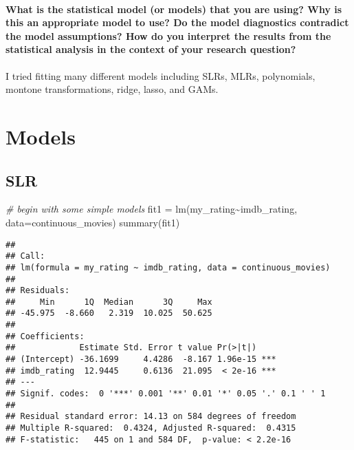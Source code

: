 \documentclass[
]{article}
\newenvironment{Shaded}{\begin{snugshade}}{\end{snugshade}}
\newcommand{\AttributeTok}[1]{\textcolor[rgb]{0.77,0.63,0.00}{#1}}
\newcommand{\CommentTok}[1]{\textcolor[rgb]{0.56,0.35,0.01}{\textit{#1}}}
\newcommand{\FunctionTok}[1]{\textcolor[rgb]{0.00,0.00,0.00}{#1}}
\newcommand{\NormalTok}[1]{#1}
\newcommand{\OtherTok}[1]{\textcolor[rgb]{0.56,0.35,0.01}{#1}}
\newcommand{\SpecialCharTok}[1]{\textcolor[rgb]{0.00,0.00,0.00}{#1}}
\begin{document}
\hypertarget{what-is-the-statistical-model-or-models-that-you-are-using-why-is-this-an-appropriate-model-to-use-do-the-model-diagnostics-contradict-the-model-assumptions-how-do-you-interpret-the-results-from-the-statistical-analysis-in-the-context-of-your-research-question}{%
\paragraph{What is the statistical model (or models) that you are using?
Why is this an appropriate model to use? Do the model diagnostics
contradict the model assumptions? How do you interpret the results from
the statistical analysis in the context of your research
question?}\label{what-is-the-statistical-model-or-models-that-you-are-using-why-is-this-an-appropriate-model-to-use-do-the-model-diagnostics-contradict-the-model-assumptions-how-do-you-interpret-the-results-from-the-statistical-analysis-in-the-context-of-your-research-question}}

I tried fitting many different models including SLRs, MLRs, polynomials,
montone transformations, ridge, lasso, and GAMs.

\hypertarget{models}{%
\section{Models}\label{models}}

\hypertarget{slr}{%
\subsection{SLR}\label{slr}}

\begin{Shaded}
\begin{Highlighting}[]
\CommentTok{\# begin with some simple models}
\NormalTok{fit1 }\OtherTok{=} \FunctionTok{lm}\NormalTok{(my\_rating}\SpecialCharTok{\textasciitilde{}}\NormalTok{imdb\_rating, }\AttributeTok{data=}\NormalTok{continuous\_movies)}
\FunctionTok{summary}\NormalTok{(fit1)}
\end{Highlighting}
\end{Shaded}

\begin{verbatim}
## 
## Call:
## lm(formula = my_rating ~ imdb_rating, data = continuous_movies)
## 
## Residuals:
##     Min      1Q  Median      3Q     Max 
## -45.975  -8.660   2.319  10.025  50.625 
## 
## Coefficients:
##             Estimate Std. Error t value Pr(>|t|)    
## (Intercept) -36.1699     4.4286  -8.167 1.96e-15 ***
## imdb_rating  12.9445     0.6136  21.095  < 2e-16 ***
## ---
## Signif. codes:  0 '***' 0.001 '**' 0.01 '*' 0.05 '.' 0.1 ' ' 1
## 
## Residual standard error: 14.13 on 584 degrees of freedom
## Multiple R-squared:  0.4324, Adjusted R-squared:  0.4315 
## F-statistic:   445 on 1 and 584 DF,  p-value: < 2.2e-16
\end{verbatim}
\end{document}
